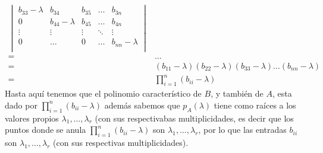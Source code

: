 \documentclass[letter]{memoir} %
\begin{document}
\begin{enumerate}
\[\begin{split}
                                \begin{vmatrix}
								b_{33}- \lambda &   b_{34} 			& b_{35} & \dots  & b_{3n}\\
            					0               &   b_{44}- \lambda &  b_{45} & \dots & b_{4n}\\
             					\vdots          &   \vdots          & \vdots  & \ddots & \vdots \\
         					    0               & \dots             & 0 & \dots &  b_{nn}-\lambda \\ 
								\end{vmatrix}  \\
               = & \dots \\
               = & (b_{11}- \lambda)(b_{22} - \lambda )( b_{33} - \lambda) \dots (b_{nn} - \lambda) \\
            	= & \prod_{i=1}^n(b_{ii} - \lambda)
\end{split}
\]
Hasta aquí tenemos que el polinomio característico de $B$, y también de $A$, esta dado por $ \prod_{i=1}^n(b_{ii} - \lambda)$ además sabemos que $p_A(\lambda)$ tiene como raíces a los valores propios $\lambda_1, \dots, \lambda_{r}$ (con sus respectivabas multiplicidades, es decir que los puntos donde se anula $ \prod_{i=1}^n(b_{ii} - \lambda)$ son $\lambda_1, \dots, \lambda_{r}$, por lo que las entradas $b_{ii}$ son $\lambda_1, \dots, \lambda_{r}$ (con sus respectivas multiplicidades).  


\end{enumerate}
\end{document}
